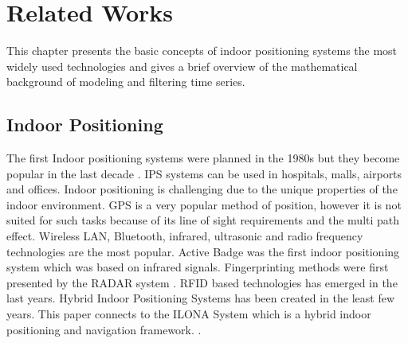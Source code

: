 \chapter{Related Works}
\label{chap:relatedWorks}
This chapter presents the basic concepts  of indoor positioning systems the most widely used technologies and gives a brief overview of the mathematical background of modeling and filtering  time series.
\section{Indoor Positioning}
The first Indoor positioning systems were planned in the 1980s but they become popular in the last decade \cite{liu2007survey,gu2009survey}. 
IPS systems can be used in hospitals, malls, airports and offices.
Indoor positioning is challenging due to the unique properties of the indoor environment.
GPS is a very popular method of position, however it is not suited for such tasks because of its line of sight requirements and the multi path effect.
Wireless LAN, Bluetooth, infrared, ultrasonic and radio frequency  technologies are the most popular.
Active Badge \cite{want1992active} was the first indoor positioning system which was based on infrared signals.
Fingerprinting methods were first presented by the RADAR system \cite{bahl2000radar}.
RFID \cite{ni2004landmarc} based technologies has emerged in the last years.
Hybrid Indoor Positioning Systems \cite{baniukevic2013hybrid} has been created in the least few years.
This paper connects to the ILONA System which is a hybrid indoor positioning and navigation framework. \cite{ZsoltToth2015}.



